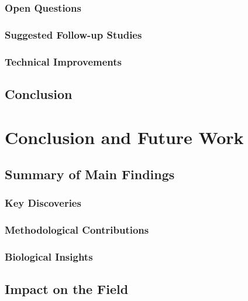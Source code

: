 \documentclass[
  11pt,
  a4paper,
]{report}
\begin{document}
\subsection{Open Questions}\label{open-questions}

\subsection{Suggested Follow-up
Studies}\label{suggested-follow-up-studies}

\subsection{Technical Improvements}\label{technical-improvements}

\section{Conclusion}\label{conclusion}


\chapter{Conclusion and Future Work}\label{conclusion-and-future-work}

\section{Summary of Main Findings}\label{summary-of-main-findings}

\subsection{Key Discoveries}\label{key-discoveries}

\subsection{Methodological
Contributions}\label{methodological-contributions}

\subsection{Biological Insights}\label{biological-insights}

\section{Impact on the Field}\label{impact-on-the-field}
\end{document}

